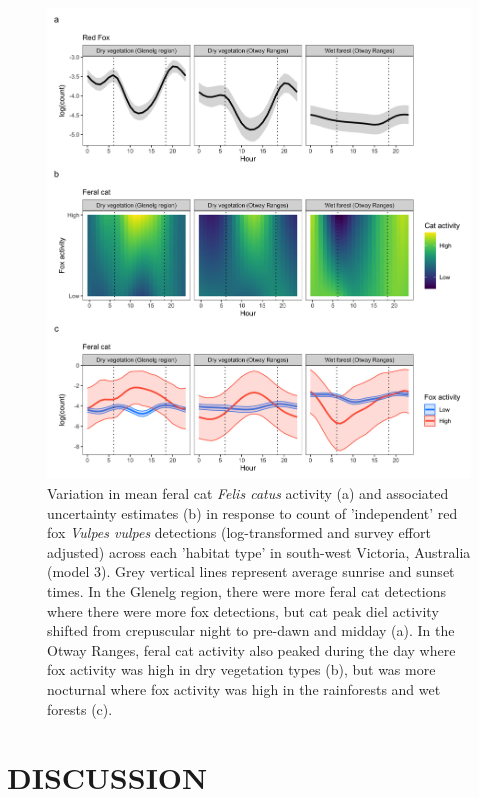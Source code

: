 \documentclass[]{elsarticle} %
\begin{document}
\begin{figure}

{\centering \includegraphics[width=1\linewidth]{../figs/cat_fox_count} 

}

\caption{Variation in mean feral cat \textit{Felis catus} activity (a) and associated uncertainty estimates (b) in response to count of ’independent’ red fox \textit{Vulpes vulpes} detections (log-transformed and survey effort adjusted) across each ’habitat type’ in south-west Victoria, Australia (model 3). Grey vertical lines represent average sunrise and sunset times. In the Glenelg region, there were more feral cat detections where there were more fox detections, but cat peak diel activity shifted from crepuscular night to pre-dawn and midday (a). In the Otway Ranges, feral cat activity also peaked during the day where fox activity was high in dry vegetation types (b), but was more nocturnal where fox activity was high in the rainforests and wet forests (c).}\label{fig:diel-cat-fox}
\end{figure}

\newpage

\hypertarget{discussion}{%
\section{DISCUSSION}\label{discussion}}
\end{document}
